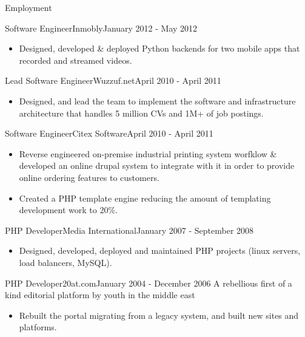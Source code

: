 \documentclass[]{mosabcv}
\begin{document}
\begin{cvsection}{Employment}
    \begin{cvsubsection}{Software Engineer}{Inmobly}{January 2012 - May 2012}
        \begin{itemize}
            \item Designed, developed \& deployed Python backends for two mobile apps that recorded and streamed videos.
        \end{itemize}
    \end{cvsubsection}
    
    \begin{cvsubsection}{Lead Software Engineer}{Wuzzuf.net}{April 2010 - April 2011}
        \begin{itemize}
            \item Designed, and lead the team to implement the software and infrastructure architecture that handles 5 million CVs and 1M+ of job postings.
        \end{itemize}
    \end{cvsubsection}
    
    \begin{cvsubsection}{Software Engineer}{Citex Software}{April 2010 - April 2011}
        \begin{itemize}
            \item Reverse engineered on-premise industrial printing system worfklow \& developed an online drupal system to integrate with it in order to provide online ordering features to customers.
            \item Created a PHP template engine reducing the amount of templating development work to 20\%.
        \end{itemize}
    \end{cvsubsection}
    
    \begin{cvsubsection}{PHP Developer}{Media International}{January 2007 - September 2008}
        \begin{itemize}
			\item Designed, developed, deployed and maintained PHP projects (linux servers, load balancers, MySQL).
        \end{itemize}
    \end{cvsubsection}
    
    \begin{cvsubsection}{PHP Developer}{20at.com}{January 2004 - December 2006}
        A rebellious first of a kind editorial platform by youth in the middle east
        \begin{itemize}
            \item Rebuilt the portal migrating from a legacy system, and built new sites and platforms.
        \end{itemize}
    \end{cvsubsection}
    
    \end{cvsection}
    
\end{document}
